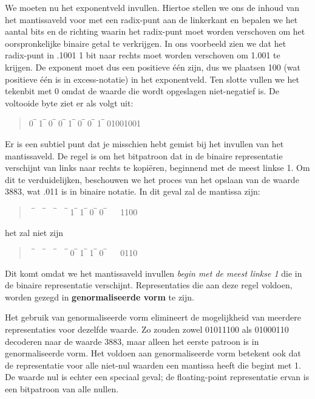 We moeten nu het exponentveld invullen. Hiertoe stellen we ons de inhoud van het mantissaveld voor met een radix-punt aan de linkerkant en bepalen we het aantal bits en de richting waarin het radix-punt moet worden verschoven om het oorspronkelijke binaire getal te verkrijgen. In ons voorbeeld zien we dat het radix-punt in .1001 1 bit naar rechts moet worden verschoven om 1.001 te krijgen. De exponent moet dus een positieve één zijn, dus we plaatsen 100 (wat positieve één is in excess-notatie) in het exponentveld. Ten slotte vullen we het tekenbit met 0 omdat de waarde die wordt opgeslagen niet-negatief is. De voltooide byte ziet er als volgt uit:
\begin{quote}
0‾  1‾  0‾  0‾  1‾  0‾  0‾  1‾  0​1​0​0​1​0​0​1​
\end{quote}

Er is een subtiel punt dat je misschien hebt gemist bij het invullen van het mantissaveld. De regel is om het bitpatroon dat in de binaire representatie verschijnt van links naar rechts te kopiëren, beginnend met de meest linkse 1. Om dit te verduidelijken, beschouwen we het proces van het opslaan van de waarde 3883​, wat .011 is in binaire notatie. In dit geval zal de mantissa zijn:
\begin{quote}
   ‾     ‾     ‾     ‾  1‾  1‾  0‾  0‾   ​ ​ ​ ​1​1​0​0​
\end{quote}
%
het zal niet zijn
\begin{quote}
   ‾     ‾     ‾     ‾  0‾  1‾  1‾  0‾   ​ ​ ​ ​0​1​1​0​
\end{quote}
%
Dit komt omdat we het mantissaveld invullen \textit{begin met de meest linkse 1} die in de binaire representatie verschijnt. Representaties die aan deze regel voldoen, worden gezegd in \textbf{genormaliseerde vorm} te zijn.

Het gebruik van genormaliseerde vorm elimineert de mogelijkheid van meerdere representaties voor dezelfde waarde. Zo zouden zowel 01011100 als 01000110 decoderen naar de waarde 3883​, maar alleen het eerste patroon is in genormaliseerde vorm. Het voldoen aan genormaliseerde vorm betekent ook dat de representatie voor alle niet-nul waarden een mantissa heeft die begint met 1. De waarde nul is echter een speciaal geval; de floating-point representatie ervan is een bitpatroon van alle nullen.

